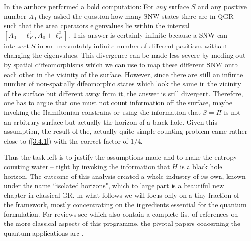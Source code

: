 \documentclass[12pt]{report}
\begin{document}
In \cite{58} the authors performed a bold computation: For
{\it any} surface $S$ and any positive number $A_0$ they asked the 
question how many SNW states there are in QGR such that the area operators
eigenvalues lie within the interval $[A_0-\ell_P^2,A_0+\ell_P^2]$.
This answer is certainly infinite because a SNW can intersect $S$ in an 
uncountably infinite number of different positions without changing the 
eigenvalues. This divergence can be made less severe by moding
out by spatial diffeomorphisms which we can use to map these different SNW
onto each other in the vicinity of the surface. However, since there are 
still an infinite number of non-spatially difeomorphic states which look 
the same in the vicinity of the surface but different away from it, the 
answer is still divergent. Therefore, one has to argue that one must 
not count information off the surface, maybe invoking the Hamiltonian
constraint or using the information that $S=H$ is not an arbitrary 
surface but actually the horizon of a black hole. Given this assumption, 
the result of the, actually quite simple counting problem came rather 
close to (\ref{3.4.1}) with the correct factor of $1/4$.

Thus the task left is to justify the assumptions made and to make the 
entropy counting water -- tight by invoking the information that 
$H$ is a black hole horizon. The outcome of this analysis created a whole
industry of its own, known under the name ``isolated horizons", which 
to large part is a beautiful new chapter in classical GR. In what follows 
we will focus only on a tiny fraction of the framework, mostly 
concentrating on the ingredients essential for the quantum formulation.
For reviews see \cite{59} which also contain a complete list of references
on the more classical aspects of this programme, the pivotal papers 
concerning the quantum applications are \cite{59a}. 
\end{document}
